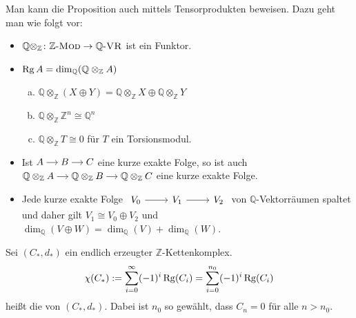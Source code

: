 Man kann die Proposition auch mittels Tensorprodukten beweisen.
Dazu geht man wie folgt vor:
\begin{itemize}
	\item $\mathbb{Q} \otimes_\mathbb{Z} \colon \mathbb{Z}\text{-}\textsc{Mod} \to \mathbb{Q}\text{-}\textsc{VR} $ ist ein Funktor.
	\item $\operatorname{Rg} A= \dim_\mathbb{Q} (\mathbb{Q} \otimes_\mathbb{Z} A)$
	\begin{enumerate}[(a)]
		\item $\mathbb{Q} \otimes_\mathbb{Z} (X \oplus Y) = \mathbb{Q} \otimes_\mathbb{Z} X \oplus  \mathbb{Q} \otimes_\mathbb{Z} Y$
		\item $\mathbb{Q} \otimes_\mathbb{Z} \mathbb{Z}^n \cong \mathbb{Q}^n$
		\item $\mathbb{Q} \otimes_\mathbb{Z} T \cong 0$ für $T$ ein Torsionsmodul.
	\end{enumerate}
	\item Ist $\begin{tikzcd}[cramped,sep=small]
		A \rar & B \rar & C
	\end{tikzcd}$ eine kurze exakte Folge, so ist auch 
	\(
		\begin{tikzcd}[cramped,sep=small]
				\mathbb{Q} \otimes_\mathbb{Z} A \rar & \mathbb{Q} \otimes_\mathbb{Z} B \rar & \mathbb{Q} \otimes_\mathbb{Z} C
			\end{tikzcd}
	\) 
	eine kurze exakte Folge.
	\item Jede kurze exakte Folge $\begin{tikzcd}
		V_0 \rar & V_1 \rar & V_2
	\end{tikzcd}$ von $\mathbb{Q}$-Vektorräumen spaltet und daher gilt $V_1 \cong V_0 \oplus V_2$ und $\dim_\mathbb{Q}(V \oplus W) = \dim_\mathbb{Q}(V)+ \dim_\mathbb{Q} (W)$.
\end{itemize}

\begin{definition}[{name=[{Eulercharakteristik von Z-Kettenkomplexen}]}]
	Sei $(C_*,d_*)$ ein endlich erzeugter $\mathbb{Z}$-Kettenkomplex.
	\[
		\chi(C_*) := \sum_{i=0}^{\infty} (-1)^i\operatorname{Rg}(C_i) = \sum_{i=0}^{n_0} (-1)^i \operatorname{Rg}(C_i) 
	\]
	heißt die  von $(C_*,d_*)$. 
	Dabei ist $n_0$ so gewählt, dass $C_n =0$ für alle $n >n_0$.
\end{definition}

